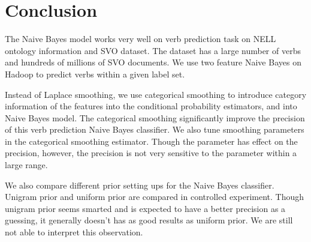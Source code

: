 \section{Conclusion}

The Naive Bayes model works very well on verb prediction task on NELL ontology information and SVO dataset. The dataset has a large number of verbs and hundreds of millions of SVO documents. We use two feature Naive Bayes on Hadoop to predict verbs within a given label set. 

Instead of Laplace smoothing, we use categorical smoothing to introduce category information of the features into the conditional probability estimators, and into Naive Bayes model. The categorical smoothing significantly improve the precision of this verb prediction Naive Bayes classifier. We also tune smoothing parameters in the categorical smoothing estimator. Though the parameter has effect on the precision, however, the precision is not very sensitive to the parameter within a large range.

We also compare different prior setting ups for the Naive Bayes classifier. Unigram prior and uniform prior are compared in controlled experiment. Though unigram prior seems smarted and is expected to have a better precision as a guessing, it generally doesn't has as good results as uniform prior. We are still not able to interpret this observation.

